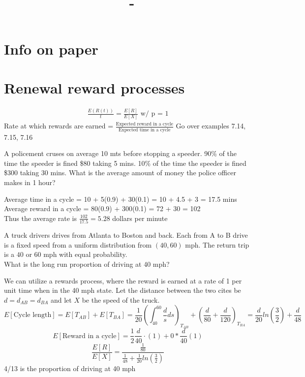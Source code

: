 \documentclass[answers,12pt,addpoints]{exam}
\author{\name}
\title{\course \ - \assignment}
\begin{document}
\maketitle


\newpage
\section*{Info on paper}

\section*{Renewal reward processes}
\begin{example}[7.3 (b)]
    \begin{align*}
        \frac{E(R(t))}{t} = \frac{E[R]}{E[X]} \text{ w/ p = 1}
    \end{align*}
    Rate at which rewards are earned = $\frac{\text{Expected reward in a cycle}}{\text{Expected time in a cycle}}$
    Go over examples 7.14, 7.15, 7.16
\end{example}
\begin{example}[1]
    A policement cruses on average 10 mts before stopping a speeder. 90\% of the time the speeder is fined \$80 taking 5 mins. 10\% of the time the speeder is fined \$300 taking 30 mins. What is the average amount of money the police officer makes in 1 hour?
    \begin{solution}
        Average time in a cycle = 10 + 5(0.9) + 30(0.1) = 10 + 4.5 + 3 = 17.5 mins\\
        Average reward in a cycle = 80(0.9) + 300(0.1) = 72 + 30 = 102\\
        Thus the average rate is $\frac{102}{17.5} = 5.28 $ dollars per minute
    \end{solution}
\end{example}
\begin{example}[2]
    A truck drivers drives from Atlanta to Boston and back. Each from A to B drive is a fixed speed from a uniform distribution from $(40, 60)$ mph. The return trip is a $40$ or $60$ mph with equal probability. \\
    What is the long run proportion of driving at 40 mph?
    \begin{solution}
        We can utilize a rewards process, where the reward is earned at a rate of 1 per unit time when in the 40 mph state. Let the distance between the two cites be $d = d_{AB} = d_{BA}$ and let $X$ be the speed of the truck.\\
        $$E[\text{Cycle length}] = E[T_{AB}] + E[T_{BA}] = \frac{1}{20} (\int_{40}^{60} \frac{d}{s} ds)_{T_{AB}}+ (\frac{d}{80} + \frac{d}{120})_{T_{BA}} = \frac{d}{20}ln\left( \frac{3}{2} \right) + \frac{d}{48}$$ 
        $$E[\text{Reward in a cycle}] = {\frac{1}{2} \frac{d}{40} \cdot (1) + 0 * \frac{d}{40} (1) } $$
        $$\frac{E[R]}{E[X]} = \frac{\frac{1}{80}}{\frac{1}{48} + \frac{1}{20}ln\left( \frac{3}{2} \right)} $$        
        4/13 is the proportion of driving at 40 mph
    \end{solution}
\end{example}
\end{document}
